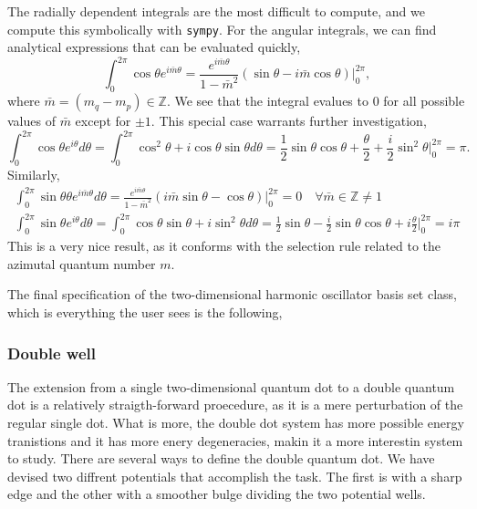 The radially dependent integrals are the most difficult to compute, and we compute this 
symbolically with \lstinline{sympy}. For the angular integrals, we can find analytical 
expressions that can be evaluated quickly,
\begin{equation}
    \int_0^{2\pi} \cos \theta e^{i\bar{m} \theta} 
    = \frac{e^{i\bar{m}\theta}}{1 - \bar{m}^2}
        (\sin \theta - i \bar{m}\cos \theta)\Big\lvert_0^{2\pi},
\end{equation}
where $\bar{m} = (m_q - m_p) \in \mathbb{Z}$. We see that the integral evalues to $0$ 
for all possible values of $\bar{m}$ except for $\pm1$. This special case warrants further 
investigation,
\begin{equation}
        \int_0^{2\pi} \cos \theta e^{i\theta} d\theta 
        = \int_0^{2\pi} \cos^2\theta + i\cos\theta\sin \theta d\theta 
        = \frac{1}{2}\sin\theta\cos\theta + \frac{\theta}{2} + \frac{i}{2}\sin^2\theta
            \Big\lvert_0^{2\pi} = \pi.
\end{equation}
Similarly,
\begin{equation}
   \begin{gathered}
   \int_0^{2\pi} \sin\theta \theta e^{i\bar{m}\theta}d\theta 
    = \frac{e^{i\bar{m}\theta}}{1 - \bar{m}^2}
        (i\bar{m}\sin\theta - \cos\theta)\Big\lvert_0^{2\pi}
        = 0 \quad \forall \bar{m} \in \mathbb{Z} \neq 1 \\
    \int_0^{2\pi} \sin \theta e^{i \theta} d\theta 
    = \int_0^{2\pi} \cos\theta \sin\theta + i \sin^2\theta d\theta
    = \frac{1}{2} \sin\theta - \frac{i}{2}\sin\theta\cos\theta + i\frac{\theta}{2}
        \Big\lvert_0^{2\pi} = i\pi
   \end{gathered}
\end{equation}
This is a very nice result, as it conforms with the selection rule related to the 
azimutal quantum number $m$.

The final specification of the two-dimensional harmonic oscillator basis set class, which 
is everything the user sees is the following,



\subsubsection{Double well}

The extension from a single two-dimensional quantum dot to a double 
quantum dot is a relatively straigth-forward proecedure, as it is 
a mere perturbation of the regular single dot. What is more, the  
double dot system has more possible energy tranistions and it has more 
enery degeneracies, makin it a more interestin system to study. There 
are several ways to define the double quantum dot. We have devised two 
diffrent potentials that accomplish the task. The first is with a 
sharp edge and the other with a smoother bulge dividing the two 
potential wells. 


